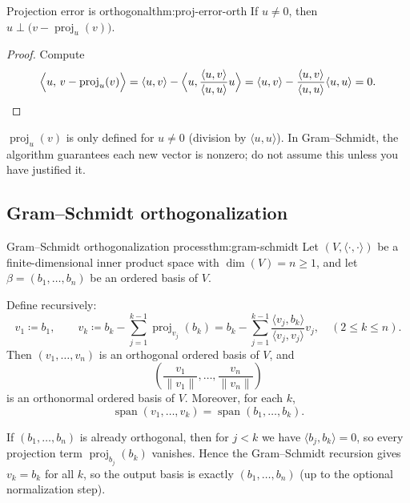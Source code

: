 \begin{theorem}{Projection error is orthogonal}{thm:proj-error-orth}
If $u\neq 0$, then $u\perp \bigl(v-\operatorname{proj}_u(v)\bigr)$.
\end{theorem}

\begin{proof}
Compute
\[
\Bigl\langle u,\,v-\operatorname{proj}_u(v)\Bigr\rangle
=\langle u,v\rangle-\Bigl\langle u,\frac{\langle u,v\rangle}{\langle u,u\rangle}u\Bigr\rangle
=\langle u,v\rangle-\frac{\langle u,v\rangle}{\langle u,u\rangle}\langle u,u\rangle
=0.
\]
\end{proof}

\begin{commonmistake}[title={Common Mistake: using projection formula without checking $u\neq 0$}]
$\operatorname{proj}_u(v)$ is only defined for $u\neq 0$ (division by $\langle u,u\rangle$).
In Gram--Schmidt, the algorithm guarantees each new vector is nonzero; do not assume this unless you have justified it.
\end{commonmistake}

\subsection{Gram--Schmidt orthogonalization}

\begin{theorem}{Gram--Schmidt orthogonalization process}{thm:gram-schmidt}
Let $(V,\langle\cdot,\cdot\rangle)$ be a finite-dimensional inner product space with $\dim(V)=n\ge 1$,
and let $\beta=(b_1,\dots,b_n)$ be an ordered basis of $V$.

Define recursively:
\[
v_1\coloneqq b_1,\qquad
v_k\coloneqq b_k-\sum_{j=1}^{k-1}\operatorname{proj}_{v_j}(b_k)
=b_k-\sum_{j=1}^{k-1}\frac{\langle v_j,b_k\rangle}{\langle v_j,v_j\rangle}v_j,\quad (2\le k\le n).
\]
Then $(v_1,\dots,v_n)$ is an orthogonal ordered basis of $V$, and
\[
\left(\frac{v_1}{\|v_1\|},\dots,\frac{v_n}{\|v_n\|}\right)
\]
is an orthonormal ordered basis of $V$.
Moreover, for each $k$,
\[
\operatorname{span}(v_1,\dots,v_k)=\operatorname{span}(b_1,\dots,b_k).
\]
\end{theorem}

\begin{examplebox}[title={Worked Example (Tutorial 10, Question 1): Gram--Schmidt on an orthogonal basis does nothing}]
If $(b_1,\dots,b_n)$ is already orthogonal, then for $j<k$ we have $\langle b_j,b_k\rangle=0$,
so every projection term $\operatorname{proj}_{b_j}(b_k)$ vanishes. Hence the Gram--Schmidt recursion gives $v_k=b_k$ for all $k$,
so the output basis is exactly $(b_1,\dots,b_n)$ (up to the optional normalization step).
\end{examplebox}

